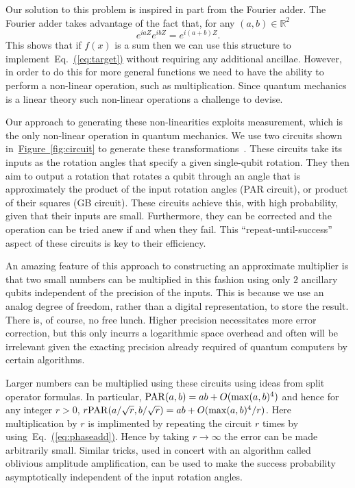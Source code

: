 \documentclass[conference]{IEEEtran}
\newcommand{\eq}[1]{Eq.~\hyperref[eq:#1]{(\ref*{eq:#1})}}
\newcommand{\fig}[1]{\hyperref[fig:#1]{Figure~\ref*{fig:#1}}}
\begin{document}
Our solution to this problem is inspired in part from the Fourier adder.  The Fourier adder takes advantage of the fact that, for any $(a,b) \in \mathbb{R}^2$
\begin{equation}
e^{ia Z} e^{ib Z} =e^{i(a+b)Z}.\label{eq:phaseadd}
\end{equation}
This shows that if $f(x)$ is a sum then we can use this structure to implement~\eq{target} without requiring any additional ancillae.  However, in order to do this for more general functions we need to have the ability to perform a non-linear operation, such as multiplication.  Since quantum mechanics is a linear theory such non-linear operations a challenge to devise.

Our approach to generating these non-linearities exploits measurement, which is the only non-linear operation in quantum mechanics.  We use two circuits shown in~\fig{circuit} to generate these transformations~\cite{WR16}.  These circuits take its inputs as the rotation angles that specify a given single-qubit rotation.  They then aim to output a rotation that rotates a qubit through an angle that is approximately the product of the input rotation angles (PAR circuit), or product of their squares (GB circuit).  These circuits achieve this, with high probability, given that their inputs are small.  Furthermore, they can be corrected and the operation can be tried anew if and when they fail.  This ``repeat-until-success'' aspect of these circuits is key to their efficiency.

An amazing feature of this approach to constructing an approximate multiplier is that two small numbers can be multiplied in this fashion using only $2$ ancillary qubits independent of the precision of the inputs.  This is because we use an analog degree of freedom, rather than a digital representation, to store the result.  There is, of course, no free lunch.  Higher precision necessitates more error correction, but this only incurrs a logarithmic space overhead and often will be irrelevant given the exacting precision already required of quantum computers by certain algorithms.

Larger numbers can be multiplied using these circuits using ideas from split operator formulas.  In particular, ${\rm PAR}( a,b) = ab + O(\max(a,b)^4)$ and hence for any integer $r>0$,
$r{\rm PAR}(a/\sqrt{r},b/\sqrt{r})=ab + O(\max(a,b)^4/r)$.  Here multiplication by $r$ is implimented by repeating the circuit $r$ times by using~\eq{phaseadd}.  Hence by taking $r\rightarrow \infty$ the error can be made arbitrarily small.  Similar tricks, used in concert with an algorithm called oblivious amplitude amplification, can be used to make the success probability asymptotically independent of the input rotation angles.
\end{document}
